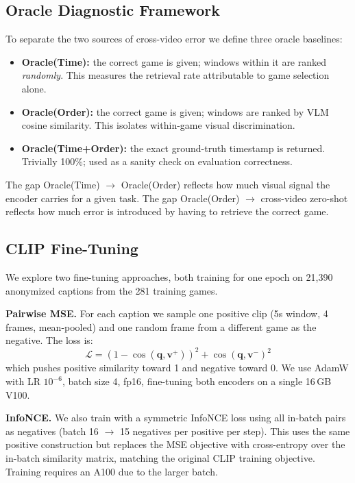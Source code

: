 \documentclass[10pt,twocolumn]{article}
\begin{document}
\subsection{Oracle Diagnostic Framework}

To separate the two sources of cross-video error we define three oracle baselines:

\begin{itemize}[nosep, leftmargin=*]
  \item \textbf{Oracle(Time):} the correct game is given; windows within it are ranked \emph{randomly}. This measures the retrieval rate attributable to game selection alone.
  \item \textbf{Oracle(Order):} the correct game is given; windows are ranked by VLM cosine similarity. This isolates within-game visual discrimination.
  \item \textbf{Oracle(Time+Order):} the exact ground-truth timestamp is returned. Trivially 100\%; used as a sanity check on evaluation correctness.
\end{itemize}

The gap Oracle(Time) $\to$ Oracle(Order) reflects how much visual signal the encoder carries for a given task. The gap Oracle(Order) $\to$ cross-video zero-shot reflects how much error is introduced by having to retrieve the correct game.

\subsection{CLIP Fine-Tuning}

We explore two fine-tuning approaches, both training for one epoch on 21,390 anonymized captions from the 281 training games.

\noindent\textbf{Pairwise MSE.}
For each caption we sample one positive clip (5s window, 4 frames, mean-pooled) and one random frame from a different game as the negative. The loss is:
\begin{equation}
  \mathcal{L} = (1 - \cos(\mathbf{q}, \mathbf{v}^+))^2 + \cos(\mathbf{q}, \mathbf{v}^-)^2
  \label{eq:loss}
\end{equation}
which pushes positive similarity toward 1 and negative toward 0. We use AdamW with LR $10^{-6}$, batch size 4, fp16, fine-tuning both encoders on a single 16\,GB V100.

\noindent\textbf{InfoNCE.}
We also train with a symmetric InfoNCE loss using all in-batch pairs as negatives (batch 16 $\to$ 15 negatives per positive per step). This uses the same positive construction but replaces the MSE objective with cross-entropy over the in-batch similarity matrix, matching the original CLIP training objective. Training requires an A100 due to the larger batch.
\end{document}
